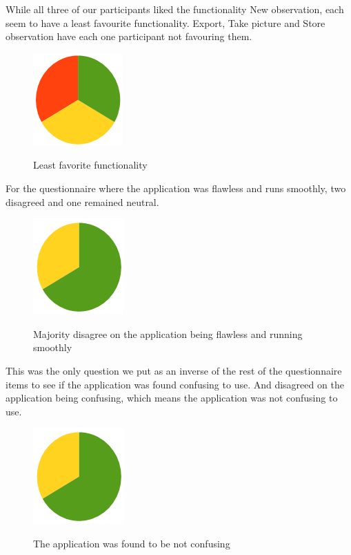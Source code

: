 While all three of our participants liked the functionality New observation, each seem to have a least favourite functionality. Export, Take picture and Store observation have each one participant not favouring them.

\begin{figure}[htb]
    \centering
    \includegraphics[scale=0.7]{ut_pic/Functionalitydislike.png}
    \label{fig:Functionality favourability}
    \caption{Least favorite functionality}
\end{figure}

For the questionnaire where the application was flawless and runs smoothly, two disagreed and one remained neutral.

\begin{figure}[htb]
    \centering
    \includegraphics[scale=0.7]{ut_pic/flawless.png}
    \label{fig:App was flawless}
    \caption{Majority disagree on the application being flawless and running smoothly}
\end{figure}

This was the only question we put as an inverse of the rest of the questionnaire items to see if the application was found confusing to use. And disagreed on the application being confusing, which means the application was not confusing to use.

\begin{figure}[htb]
    \centering
    \includegraphics[scale=0.7]{ut_pic/flawless.png}
    \label{fig:App was confusing to use}
    \caption{The application was found to be not confusing}
\end{figure}

